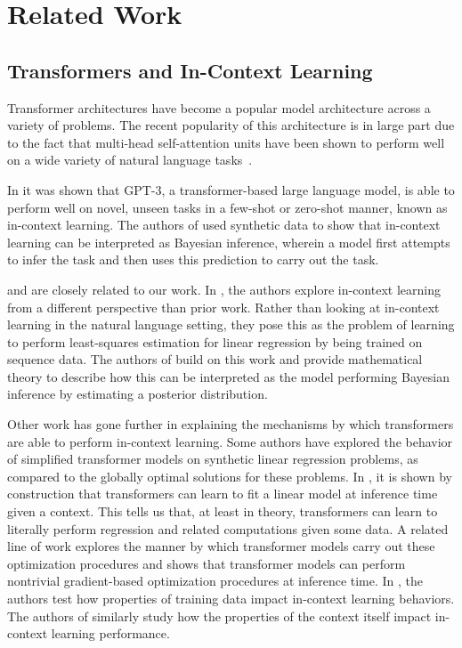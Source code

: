 \documentclass[journal,letterpaper,onecolumn]{IEEEtran}
\begin{document}
\section{Related Work}
\subsection{Transformers and In-Context Learning}
Transformer architectures have become a popular model architecture across a variety of problems. The recent popularity of this architecture is in large part due to the fact that multi-head self-attention units have been shown to perform well on a wide variety of natural language tasks~\cite{NIPS2017_3f5ee243}.

In \cite{LanguageModelsAreFewShotLearners} it was shown that GPT-3, a transformer-based large language model, is able to perform well on novel, unseen tasks in a few-shot or zero-shot manner, known as in-context learning. The authors of \cite{xie2022an} used synthetic data to show that in-context learning can be interpreted as Bayesian inference, wherein a model first attempts to infer the task and then uses this prediction to carry out the task.

\cite{garg2023transformers} and \cite{ahuja2023incontext} are closely related to our work. In \cite{garg2023transformers}, the authors explore in-context learning from a different perspective than prior work. Rather than looking at in-context learning in the natural language setting, they pose this as the problem of learning to perform least-squares estimation for linear regression by being trained on sequence data. The authors of \cite{ahuja2023incontext} build on this work and provide mathematical theory to describe how this can be interpreted as the model performing Bayesian inference by estimating a posterior distribution.

Other work has gone further in explaining the mechanisms by which transformers are able to perform in-context learning. Some authors have explored the behavior of simplified transformer models on synthetic linear regression problems, as compared to the globally optimal solutions for these problems\cite{mahankali2023step,Zhang2023TrainedTL}.
In \cite{whatlearningalgorithm}, it is shown by construction that transformers can learn to fit a linear model at inference time given a context. This tells us that, at least in theory, transformers can learn to literally perform regression and related computations given some data. A related line of work explores the manner by which transformer models carry out these optimization procedures and shows that transformer models can perform nontrivial gradient-based optimization procedures at inference time\cite{von2023transformers,ahn2023transformers}. 
In \cite{EmergentICL}, the authors test how properties of training data impact in-context learning behaviors. 
The authors of \cite{min2022rethinking} similarly study how the properties of the context itself impact in-context learning performance. 
\end{document}
